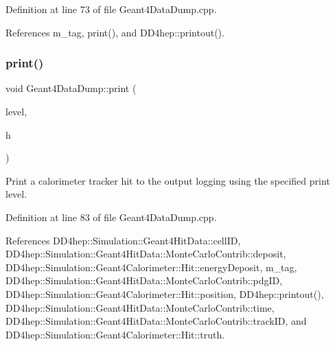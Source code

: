 Definition at line 73 of file Geant4\+Data\+Dump.\+cpp.



References m\+\_\+tag, print(), and D\+D4hep\+::printout().

\hypertarget{class_d_d4hep_1_1_simulation_1_1_geant4_data_dump_a213bbcf2c9fb78f71afefe34935f3017}{}\label{class_d_d4hep_1_1_simulation_1_1_geant4_data_dump_a213bbcf2c9fb78f71afefe34935f3017} 
\subsubsection{\texorpdfstring{print()}{print()}\hspace{0.1cm}{\footnotesize\ttfamily [5/6]}}
{\footnotesize\ttfamily void Geant4\+Data\+Dump\+::print (\begin{DoxyParamCaption}\item[{\hyperlink{namespace_d_d4hep_a5b5a64d56252469451f2020a27d57d42}{Print\+Level}}]{level,  }\item[{const \hyperlink{class_d_d4hep_1_1_simulation_1_1_geant4_data_dump_abbb746f00c083cdb09c3e0331cb920be}{Calorimeter\+Hit} $\ast$}]{h }\end{DoxyParamCaption})}



Print a calorimeter tracker hit to the output logging using the specified print level. 



Definition at line 83 of file Geant4\+Data\+Dump.\+cpp.



References D\+D4hep\+::\+Simulation\+::\+Geant4\+Hit\+Data\+::cell\+ID, D\+D4hep\+::\+Simulation\+::\+Geant4\+Hit\+Data\+::\+Monte\+Carlo\+Contrib\+::deposit, D\+D4hep\+::\+Simulation\+::\+Geant4\+Calorimeter\+::\+Hit\+::energy\+Deposit, m\+\_\+tag, D\+D4hep\+::\+Simulation\+::\+Geant4\+Hit\+Data\+::\+Monte\+Carlo\+Contrib\+::pdg\+ID, D\+D4hep\+::\+Simulation\+::\+Geant4\+Calorimeter\+::\+Hit\+::position, D\+D4hep\+::printout(), D\+D4hep\+::\+Simulation\+::\+Geant4\+Hit\+Data\+::\+Monte\+Carlo\+Contrib\+::time, D\+D4hep\+::\+Simulation\+::\+Geant4\+Hit\+Data\+::\+Monte\+Carlo\+Contrib\+::track\+ID, and D\+D4hep\+::\+Simulation\+::\+Geant4\+Calorimeter\+::\+Hit\+::truth.

\hypertarget{class_d_d4hep_1_1_simulation_1_1_geant4_data_dump_aedbce540469e2c554096f3b87fbd9991}{}\label{class_d_d4hep_1_1_simulation_1_1_geant4_data_dump_aedbce540469e2c554096f3b87fbd9991} 
